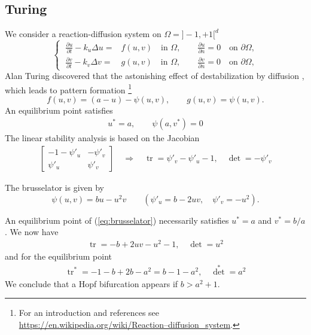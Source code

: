 \documentclass[11pt]{article}
\begin{document}
\subsection{Turing}\label{subsec:}
%
We consider a reaction-diffusion system on $\Omega=]-1,+1[^d$
%
\begin{equation}\label{eq:reacdiff}
\left\{\;
\begin{split}
\frac{\partial u}{\partial t}  -k_u\Delta u =& f(u,v)\quad\mbox{in $\Omega$},\qquad \frac{\partial u}{\partial n}=0\quad\mbox{on $\partial\Omega$},\\
\frac{\partial v}{\partial t}  -k_v \Delta v=&  g(u,v)\quad\mbox{in $\Omega$},\qquad \frac{\partial v}{\partial n}=0\quad\mbox{on $\partial\Omega$},
\end{split}
\right.
\end{equation}
%
Alan Turing discovered that the astonishing effect of destabilization by diffusion \cite{Turing52}, which leads to pattern formation 
\footnote{For an introduction and references see \url{https://en.wikipedia.org/wiki/Reaction–diffusion_system}.}
%
\begin{equation}\label{eq:}
f(u,v) = (a-u) - \psi(u,v),\qquad  g(u,v)=\psi(u,v).
\end{equation}
%
An equilibrium point satisfies
%
\begin{align*}
u^* = a,\qquad \psi(a,v^*)=0
\end{align*}
%
The linear stability analysis is based on the Jacobian
%
\begin{align*}
\begin{bmatrix}
-1 -\psi'_u & -\psi'_v\\ \psi'_u & \psi'_v
\end{bmatrix}
\quad\Rightarrow\quad \operatorname{tr} = \psi'_v-\psi'_u-1,\quad \det= -\psi'_v
\end{align*}

The brusselator is given by
%
\begin{equation}\label{eq:brusselator}
\psi(u,v) = bu - u^2v\qquad ( \psi'_u = b-2uv,\quad \psi'_v=-u^2).
\end{equation}

An equilibrium point of (\ref{eq:brusselator}) necessarily satisfies $u^*=a$ and $v^*=b/a$. We now have
%
\begin{align*}
\operatorname{tr} = -b + 2uv -u^2-1 ,\quad \det = u^2
\end{align*}
%
and for the equilibrium point
%
\begin{align*}
\operatorname{tr}^* = -1 - b +2b -a^2 = b-1-a^2,\quad {\det}^* = a^2
\end{align*}
%
We conclude that a  Hopf bifurcation appears if $b>a^2+1$.
\end{document}
